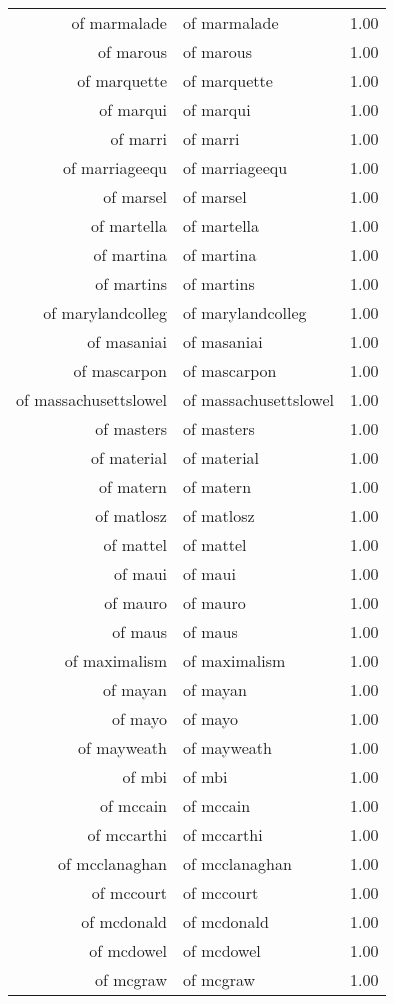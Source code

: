 \begin{table}[ht]
\begin{tabular}{rlr}
  of marmalade & of marmalade & 1.00 \\ 
  of marous & of marous & 1.00 \\ 
  of marquette & of marquette & 1.00 \\ 
  of marqui & of marqui & 1.00 \\ 
  of marri & of marri & 1.00 \\ 
  of marriageequ & of marriageequ & 1.00 \\ 
  of marsel & of marsel & 1.00 \\ 
  of martella & of martella & 1.00 \\ 
  of martina & of martina & 1.00 \\ 
  of martins & of martins & 1.00 \\ 
  of marylandcolleg & of marylandcolleg & 1.00 \\ 
  of masaniai & of masaniai & 1.00 \\ 
  of mascarpon & of mascarpon & 1.00 \\ 
  of massachusettslowel & of massachusettslowel & 1.00 \\ 
  of masters & of masters & 1.00 \\ 
  of material & of material & 1.00 \\ 
  of matern & of matern & 1.00 \\ 
  of matlosz & of matlosz & 1.00 \\ 
  of mattel & of mattel & 1.00 \\ 
  of maui & of maui & 1.00 \\ 
  of mauro & of mauro & 1.00 \\ 
  of maus & of maus & 1.00 \\ 
  of maximalism & of maximalism & 1.00 \\ 
  of mayan & of mayan & 1.00 \\ 
  of mayo & of mayo & 1.00 \\ 
  of mayweath & of mayweath & 1.00 \\ 
  of mbi & of mbi & 1.00 \\ 
  of mccain & of mccain & 1.00 \\ 
  of mccarthi & of mccarthi & 1.00 \\ 
  of mcclanaghan & of mcclanaghan & 1.00 \\ 
  of mccourt & of mccourt & 1.00 \\ 
  of mcdonald & of mcdonald & 1.00 \\ 
  of mcdowel & of mcdowel & 1.00 \\ 
  of mcgraw & of mcgraw & 1.00 \\ 

\end{tabular}
\end{table}

